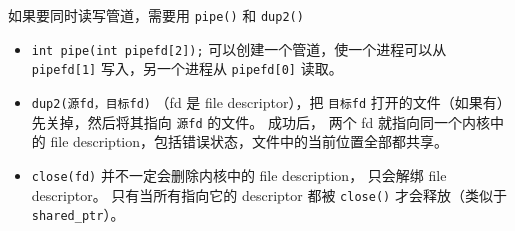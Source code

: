如果要同时读写管道，需要用 \verb`pipe()` 和 \verb`dup2()`
\begin{itemize}
\item \verb`int pipe(int pipefd[2]);` 可以创建一个管道，使一个进程可以从 \verb`pipefd[1]` 写入，另一个进程从 \verb`pipefd[0]` 读取。
\item \verb`dup2(源fd，目标fd)` （fd 是 file descriptor），把 \verb`目标fd` 打开的文件（如果有）先关掉，然后将其指向 \verb`源fd` 的文件。 成功后， 两个 fd 就指向同一个内核中的 file description，包括错误状态，文件中的当前位置全部都共享。
\item \verb`close(fd)` 并不一定会删除内核中的 file description， 只会解绑 file descriptor。 只有当所有指向它的 descriptor 都被 \verb`close()` 才会释放（类似于 \verb`shared_ptr`）。
\end{itemize}

